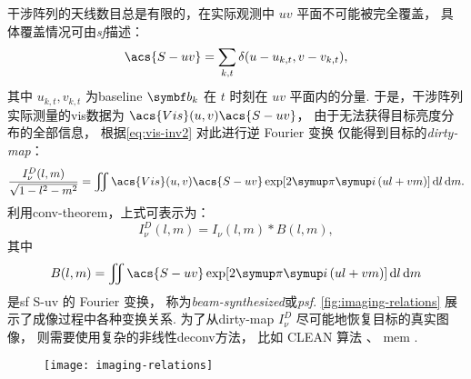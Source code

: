 干涉阵列的天线数目总是有限的，在实际观测中 $uv$ 平面不可能被完全覆盖，
具体覆盖情况可由\emph{\acf{sf}}描述：
\begin{equation}
  \label{eq:sf}
  \acs{S-uv} = \sum_{k,t} \delta(u - u_{k,t}, v - v_{k,t}),
\end{equation}
其中 $u_{k,t}, v_{k,t}$ 为\ac{baseline} $\B{b}_k$ 在 $t$ 时刻在 $uv$ 平面内的分量.
于是，干涉阵列实际测量的\ac{vis}数据为 $\acs{Vis}(u,v) \acs{S-uv}$，
由于无法获得目标亮度分布的全部信息，
根据\autoref{eq:vis-inv2} 对此进行逆 Fourier 变换
仅能得到目标的\emph{\acf{dirty-map}}：
\begin{equation}
  \label{eq:dirty-map}
  \frac{I_{\nu}^D(l,m)}{\sqrt{1-l^2-m^2}} = \iint
    \acs{Vis}(u,v) \acs{S-uv} \exp [2\Cpi\Ci\, (ul+vm)] \,\D{l}\,\D{m}.
\end{equation}
利用\ac{conv-theorem}，上式可表示为：
\begin{equation}
  I_{\nu}^D(l,m) = I_{\nu}(l,m) * B(l,m),
\end{equation}
其中
\begin{equation}
  \label{eq:syn-beam}
  B(l,m) = \iint \acs{S-uv} \exp [2\Cpi\Ci\, (ul+vm)] \,\D{l}\,\D{m}
\end{equation}
是\ac{sf} \acs{S-uv} 的 Fourier 变换，
称为\emph{\acf{beam-synthesized}}或\emph{\acf{psf}}.
\autoref{fig:imaging-relations} 展示了成像过程中各种变换关系.
为了从\ac{dirty-map} $I_{\nu}^D$ 尽可能地恢复目标的真实图像，
则需要使用复杂的非线性\ac{deconv}方法，
比如 CLEAN 算法 \cite{hogbom1974,cornwell1999}、
\ac{mem} \cite{narayan1986}.

\begin{figure}[htp]
  \centering
  \texttt{[image: imaging-relations]}
  \label{fig:imaging-relations}
\end{figure}

